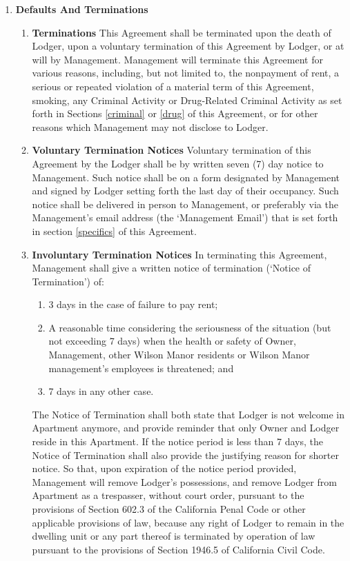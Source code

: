 \documentclass[12pt,letterpaper]{article}
\newcommand{\management}{Management}
\newcommand{\myemail}{Management Email}
\newcommand{\condo}{Wilson Manor}
\newcommand{\apt}{Apartment}
\newcommand{\room}{Room}
\newcommand{\lodger}{Lodger}
\begin{document}
\begin{enumerate}
\begin{enumerate}
			\item \textbf{Housekeeping Inspections} \quad At least twice a year, \management{} shall inspect the \room{} for the purpose of ascertaining the condition of the \room{}. Such inspection shall be routine. 
		\end{enumerate}
	\item \textbf{Defaults And Terminations} \quad 
		\begin{enumerate}
			\item \textbf{Terminations} \quad 
				This Agreement shall be terminated upon the death of \lodger{}, upon a voluntary termination of this Agreement by \lodger{}, or at will by \management{}. \management{} will terminate this Agreement for various reasons, including, but not limited to, the nonpayment of rent, a serious or repeated violation of a material term of this Agreement, smoking, any Criminal Activity or Drug-Related Criminal Activity as set forth in Sections \ref{criminal} or \ref{drug} of this Agreement, or for other reasons which \management{} may not disclose to \lodger{}.
			\item \textbf{Voluntary Termination Notices} \quad 
				Voluntary termination of this Agreement by the \lodger{} shall be by written seven (7) day notice to \management{}. Such notice shall be on a form designated by \management{} and signed by \lodger{} setting forth the last day of their occupancy. Such notice shall be delivered in person to \management{}, or preferably via the \management{}'s email address (the `\myemail{}') that is set forth in section \ref{specifics} of this Agreement{}. 
			\item \textbf{Involuntary Termination Notices} \label{terminate}
				\quad In terminating this Agreement, \management{} shall give a written notice of termination (`Notice of Termination') of: 
				\begin{enumerate}
					\item 3 days in the case of failure to pay rent; 
					\item A reasonable time considering the seriousness of the situation (but not exceeding 7 days) when the health or safety of Owner, \management{}, other \condo{} residents or \condo{} management's employees is threatened; and 
					\item 7 days in any other case. 
				\end{enumerate} 
				The Notice of Termination shall both state that \lodger{} is not welcome in \apt{} anymore, and provide reminder that only Owner and \lodger{} reside in this \apt{}. If the notice period is less than 7 days, the Notice of Termination shall also provide the justifying reason for shorter notice. So that, upon expiration of the notice period provided, \management{} will remove \lodger{}'s possessions, and remove \lodger{} from \apt{} as a trespasser, without court order, pursuant to the provisions of Section 602.3 of the California Penal Code or other applicable provisions of law, because any right of \lodger{} to remain in the dwelling unit or any part thereof is terminated by operation of law pursuant to the provisions of Section 1946.5 of California Civil Code.

\end{enumerate}
\end{enumerate}
\end{document}
